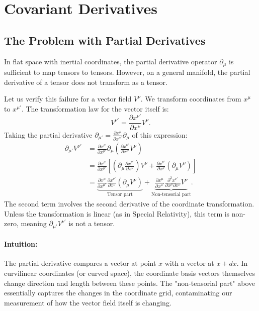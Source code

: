 \documentclass[11pt, a4paper]{report}
\begin{document}
\section{Covariant Derivatives}

\subsection*{The Problem with Partial Derivatives}
In flat space with inertial coordinates, the partial derivative operator \(\partial_\mu\) is sufficient to map tensors to tensors. However, on a general manifold, the partial derivative of a tensor does not transform as a tensor.

Let us verify this failure for a vector field \(V^\nu\). We transform coordinates from \(x^\mu\) to \(x^{\mu'}\). The transformation law for the vector itself is:
\begin{equation}
V^{\nu'} = \frac{\partial x^{\nu'}}{\partial x^\nu} V^\nu.
\end{equation}
Taking the partial derivative \(\partial_{\mu'} = \frac{\partial x^\mu}{\partial x^{\mu'}} \partial_\mu\) of this expression:
\begin{align}
\partial_{\mu'} V^{\nu'} &= \frac{\partial x^\mu}{\partial x^{\mu'}} \partial_\mu \left( \frac{\partial x^{\nu'}}{\partial x^\nu} V^\nu \right) \\
&= \frac{\partial x^\mu}{\partial x^{\mu'}} \left[ \left( \partial_\mu \frac{\partial x^{\nu'}}{\partial x^\nu} \right) V^\nu + \frac{\partial x^{\nu'}}{\partial x^\nu} (\partial_\mu V^\nu) \right] \\
&= \underbrace{\frac{\partial x^\mu}{\partial x^{\mu'}} \frac{\partial x^{\nu'}}{\partial x^\nu} (\partial_\mu V^\nu)}_{\text{Tensor part}} + \underbrace{\frac{\partial x^\mu}{\partial x^{\mu'}} \frac{\partial^2 x^{\nu'}}{\partial x^\mu \partial x^\nu} V^\nu}_{\text{Non-tensorial part}}.
\end{align}
The second term involves the second derivative of the coordinate transformation. Unless the transformation is linear (as in Special Relativity), this term is non-zero, meaning \(\partial_{\mu'} V^{\nu'}\) is not a tensor.

\paragraph{Intuition:} The partial derivative compares a vector at point \(x\) with a vector at \(x + dx\). In curvilinear coordinates (or curved space), the coordinate basis vectors themselves change direction and length between these points. The "non-tensorial part" above essentially captures the changes in the coordinate grid, contaminating our measurement of how the vector field itself is changing.
\end{document}
